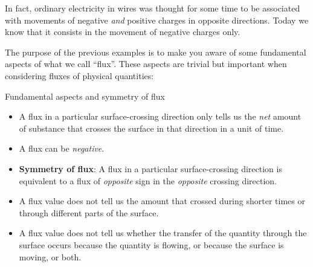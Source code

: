 \documentclass[a4paper,12pt,%
onecolumn,oneside,%
british%
]{memoir}
\renewcommand*{\|}[1][]{\nonscript\:#1\vert\nonscript\:\mathopen{}}
\begin{document}
%
In fact, ordinary electricity in wires was thought for some time to be associated with movements of negative \emph{and} positive charges in opposite directions. Today we know that it consists in the movement of negative charges only.

\medskip

The purpose of the previous examples is to make you aware of some fundamental aspects of what we call \enquote{flux}. These aspects are trivial but important when considering fluxes of physical quantities:
%
\begin{definition}{Fundamental aspects and symmetry of flux}\label{def:symmetryflux}
  \begin{itemize}[nosep]
  \item A flux in a particular surface-crossing direction only tells us the \emph{net} amount of substance that crosses the surface in that direction in a unit of time.

  \item A flux can be \emph{negative}.

  \item \textbf{Symmetry of flux}: A flux in a particular surface-crossing direction is equivalent to a flux of \emph{opposite} sign in the \emph{opposite} crossing direction.
  \end{itemize}
\end{definition}
%
%

\begin{warning}
  \begin{itemize}[nosep]
  \item A flux value does not tell us the amount that crossed during shorter times or through different parts of the surface.

\item A flux value does not tell us whether the transfer of the quantity through the surface occurs because the quantity is flowing, or because the surface is moving, or both.
  \end{itemize}
\end{warning}
\end{document}
